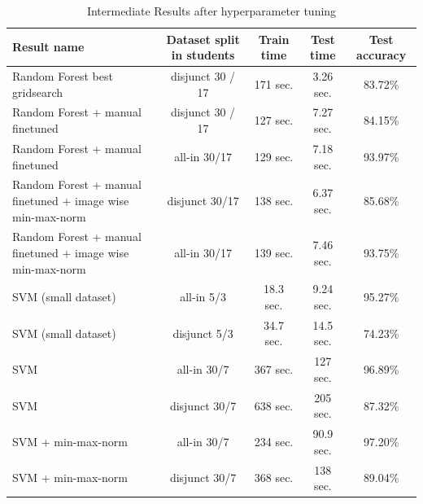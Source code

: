 \documentclass[conference]{IEEEtran}
\begin{document}
\begin{table}[htbp]
    \caption{Intermediate Results after hyperparameter tuning}
    \begin{center}
    \begin{tabular}{|l|c|c|c|c|}
        \hline
        \textbf{Result name} & \textbf{Dataset split in students } & \textbf{Train time} & \textbf{Test time} & \textbf{Test accuracy} \\
        \hline
        Random Forest best gridsearch & disjunct 30 / 17 & 171 sec. & 3.26 sec. & 83.72\% \\
        \hline
        Random Forest + manual finetuned & disjunct 30 / 17 & 127 sec. & 7.27 sec. & 84.15\% \\
        \hline
        Random Forest + manual finetuned & all-in 30/17 & 129 sec. & 7.18 sec. & 93.97\% \\
        \hline
        Random Forest + manual finetuned + image wise min-max-norm & disjunct 30/17 & 138 sec. & 6.37 sec. & 85.68\% \\
        \hline
        Random Forest + manual finetuned + image wise min-max-norm & all-in 30/17 & 139 sec. & 7.46 sec. & 93.75\% \\
        \hline
        SVM (small dataset) & all-in 5/3 & 18.3 sec. & 9.24 sec. & 95.27\% \\
        \hline
        SVM (small dataset) & disjunct 5/3 & 34.7 sec. & 14.5 sec. & 74.23\% \\
        \hline
        SVM  & all-in 30/7 & 367 sec. & 127 sec. & 96.89\% \\
        \hline
        SVM  & disjunct 30/7 & 638 sec. & 205 sec. & 87.32\% \\
        \hline
        SVM + min-max-norm & all-in 30/7 & 234 sec. & 90.9 sec. & 97.20\% \\
        \hline
        SVM + min-max-norm & disjunct 30/7 & 368 sec. & 138 sec. & 89.04\% \\
        \hline

        
    \end{tabular}
    \label{table:timeIntermediateResults}
    \end{center}
\end{table}
\end{document}
